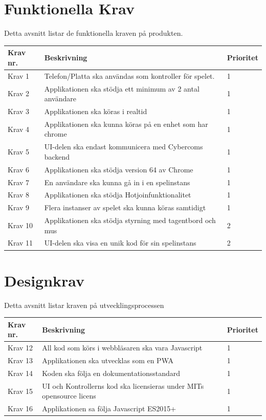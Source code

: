 \documentclass[10pt]{article}
\begin{document}
\pagebreak
\section{Funktionella Krav}
	Detta avsnitt listar de funktionella kraven på produkten.	
	
	\begin{tabular}{| p{2cm} | p{8cm} | p{2cm}|}
		\hline
		
		\textbf{Krav nr.} & \textbf{Beskrivning} &\textbf{Prioritet} \\ \hline
		Krav 1 & Telefon/Platta ska användas som kontroller för spelet. & 1 \\ \hline
		Krav 2 & Applikationen ska stödja ett minimum av 2 antal användare & 1 \\ \hline
		Krav 3 & Applikationen ska köras i realtid & 1 \\ \hline
		Krav 4 & Applikationen ska kunna köras på en enhet som har chrome & 1 \\ \hline
		Krav 5 & UI-delen ska endast kommunicera med Cybercoms backend & 1 \\ \hline
		Krav 6 & Applikationen ska stödja version 64 av Chrome & 1 \\ \hline
		Krav 7 & En användare ska kunna gå in i en spelinstans & 1 \\ \hline
		Krav 8 & Applikationen ska stödja Hotjoinfunktionalitet & 1 \\ \hline
		Krav 9 & Flera instanser av spelet ska kunna köras samtidigt & 1 \\ \hline
		Krav 10 & Applikationen ska stödja styrning med tagentbord och mus & 2 \\ \hline
		Krav 11 & UI-delen ska visa en unik kod för sin spelinstans & 2 \\ \hline
	\end{tabular}
	
\section{Designkrav}
	Detta avsnitt listar kraven på utvecklingsprocessen
	
	\begin{tabular}{| p{2cm} | p{8cm} | p{2cm}|}
		\hline
		\textbf{Krav nr.} & \textbf{Beskrivning} & \textbf{Prioritet} \\ \hline
		
		Krav 12 & All kod som körs i webbläsaren ska vara Javascript & 1 \\ \hline
		Krav 13 & Applikationen ska utvecklas som en PWA & 1 \\ \hline
		Krav 14 & Koden ska följa en dokumentationsstandard & 1 \\ \hline
		Krav 15 & UI och Kontrollerns kod ska licensieras under MITs opensource licens & 1 \\ \hline
		Krav 16 & Applikationen sa följa Javascript ES2015+ & 1 \\ \hline
	\end{tabular}
\end{document}
